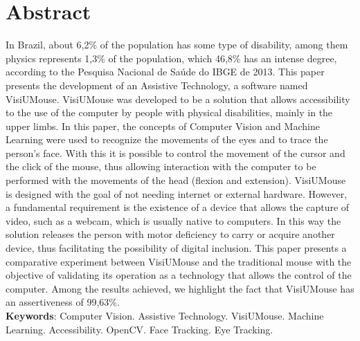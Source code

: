 \chapter*{Abstract}
{\fontsize{12pt}{\baselineskip} \selectfont \noindent {}
In Brazil, about 6,2\% of the population has some type of disability, among them physics represents 1,3\% of the population, which 46,8\% has an intense degree, according to the {Pesquisa  Nacional de Saúde do IBGE de 2013}. This paper presents the development of an Assistive Technology, a software named VisiUMouse. VisiUMouse was developed to be a solution that allows accessibility to the use of the computer by people with physical disabilities, mainly in the upper limbs. In this paper, the concepts of Computer Vision and Machine Learning were used to recognize the movements of the eyes and to trace the person's face. With this it is possible to control the movement of the cursor and the click of the mouse, thus allowing interaction with the computer to be performed with the movements of the head (flexion and extension). VisiUMouse is designed with the goal of not needing internet or external hardware. However, a fundamental requirement is the existence of a device that allows the capture of video, such as a webcam, which is usually native to computers. In this way the solution releases the person with motor deficiency to carry or acquire another device, thus facilitating the possibility of digital inclusion. This paper presents a comparative experiment between VisiUMouse and the traditional mouse with the objective of validating its operation as a technology that allows the control of the computer. Among the results achieved, we highlight the fact that VisiUMouse has an assertiveness of 99,63\%.
}
\\

\noindent \onehalfspacing {}
\textbf{Keywords}: Computer Vision. Assistive Technology. VisiUMouse. Machine Learning. Accessibility. OpenCV. Face Tracking. Eye Tracking.